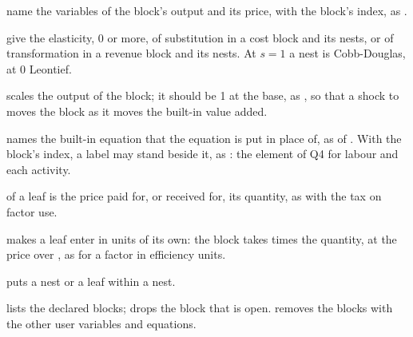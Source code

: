 
\begin{optdesc}
\item[\optarg{out}{put}{reference} \optarg{pr}{ice}{reference}] name the
variables of the block's output and its price, with the block's index, as
.

\item[\optarg{}{s}{\#}, \optarg{}{t}{\#}] give the elasticity, 0 or more, of
substitution in a cost block and its nests, or of transformation in a revenue
block and its nests. At $s = 1$ a nest is Cobb-Douglas, at 0 Leontief.

\item[\optarg{eff}{iciency}{expression}] scales the output of the block; it
should be 1 at the base, as , so that a
shock to  moves the block as it moves the built-in value added.

\item[\optarg{rep}{lace}{block}] names the built-in equation that the
equation is put in place of, as  of .
With the block's index, a label may stand beside it, as
: the element of Q4 for labour and each activity.

\item[\optarg{pr}{ice}{expression}] of a leaf is the price paid for, or
received for, its quantity, as 
with the tax on factor use.

\item[\optarg{un}{its}{expression}] makes a leaf enter in units of its own:
the block takes  times the quantity, at the price over
, as  for a factor in efficiency units.

\item[\optarg{}{in}{nestname}] puts a nest or a leaf within a nest.

\item[\opt{}{list}] lists the declared blocks;  drops the block
that is open.  removes the blocks with the
other user variables and equations.
\end{optdesc}


